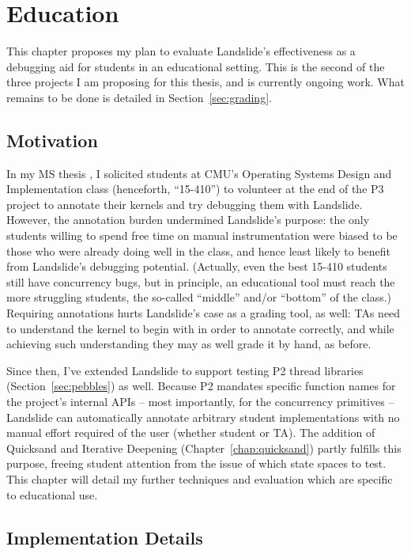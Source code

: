 \chapter{Education}
\label{chap:410}

This chapter proposes my plan to evaluate Landslide's effectiveness as a debugging aid for students in an educational setting.
This is the second of the three projects I am proposing for this thesis, and is currently ongoing work.
What remains to be done is detailed in Section~\ref{sec:grading}.

\section{Motivation}

In my MS thesis \cite{landslide}, I solicited students at CMU's Operating Systems Design and Implementation class
(henceforth, ``15-410'')
to volunteer at the end of the P3 project to annotate their kernels and try debugging them with Landslide.
However, the annotation burden undermined Landslide's purpose:
the only students willing to spend free time on manual instrumentation were biased to be those who were already doing well in the class,
and hence least likely to benefit from Landslide's debugging potential.
(Actually, even the best 15-410 students still have concurrency bugs,
but in principle, an educational tool must reach the more struggling students,
the so-called ``middle'' and/or ``bottom'' of the class.)
%
Requiring annotations hurts Landslide's case as a grading tool, as well:
TAs need to understand the kernel to begin with in order to annotate correctly,
and while achieving such understanding they may as well grade it by hand, as before.

Since then, I've extended Landslide to support testing P2 thread libraries (Section~\ref{sec:pebbles}) as well.
Because P2 mandates specific function names for the project's internal APIs
-- most importantly, for the concurrency primitives --
Landslide can automatically annotate arbitrary student implementations with no manual effort required of the user (whether student or TA).
The addition of Quicksand and Iterative Deepening (Chapter~\ref{chap:quicksand}) partly fulfills this purpose,
freeing student attention from the issue of which state spaces to test.
This chapter will detail my further techniques and evaluation which are specific to educational use.

\section{Implementation Details}

